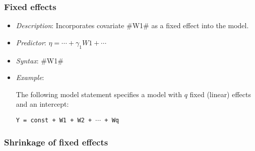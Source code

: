 \subsubsection*{Fixed effects}

\begin{itemize}
\item[] {\em Description}: Incorporates covariate #W1# as a fixed effect into the model.
\item[] {\em Predictor}: $\eta =  \cdots + \gamma_1 W1 + \cdots$
\item[] {\em Syntax}: #W1#
\item[] {\em Example}:

The following model statement specifies a model with $q$ fixed
(linear) effects and an intercept:

\texttt{Y = const + W1 + W2 + $\cdots$ + Wq}
\end{itemize}

\subsubsection*{Shrinkage of fixed effects}


